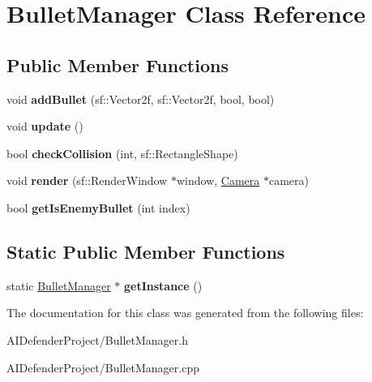 \hypertarget{class_bullet_manager}{}\section{Bullet\+Manager Class Reference}
\label{class_bullet_manager}
\subsection*{Public Member Functions}
\begin{DoxyCompactItemize}
\item 
\mbox{\label{class_bullet_manager_a7033a1eceb09644c8d0084c9d34c7b43}} 
void {\bfseries add\+Bullet} (sf\+::\+Vector2f, sf\+::\+Vector2f, bool, bool)
\item 
\mbox{\label{class_bullet_manager_ae8638f3b70fe44a15413e1107ea806fe}} 
void {\bfseries update} ()
\item 
\mbox{\label{class_bullet_manager_a42da1416dcbc47691ee6722eb8b744c1}} 
bool {\bfseries check\+Collision} (int, sf\+::\+Rectangle\+Shape)
\item 
\mbox{\label{class_bullet_manager_afbb0727bcda4c29055c23604fb60536b}} 
void {\bfseries render} (sf\+::\+Render\+Window $\ast$window, \hyperlink{class_camera}{Camera} $\ast$camera)
\item 
\mbox{\label{class_bullet_manager_a923c9563f241934310838bbbb7864dda}} 
bool {\bfseries get\+Is\+Enemy\+Bullet} (int index)
\end{DoxyCompactItemize}
\subsection*{Static Public Member Functions}
\begin{DoxyCompactItemize}
\item 
\mbox{\label{class_bullet_manager_a64c2602d2431ffe986b789bfc4f8e729}} 
static \hyperlink{class_bullet_manager}{Bullet\+Manager} $\ast$ {\bfseries get\+Instance} ()
\end{DoxyCompactItemize}


The documentation for this class was generated from the following files\+:\begin{DoxyCompactItemize}
\item 
A\+I\+Defender\+Project/Bullet\+Manager.\+h\item 
A\+I\+Defender\+Project/Bullet\+Manager.\+cpp\end{DoxyCompactItemize}
